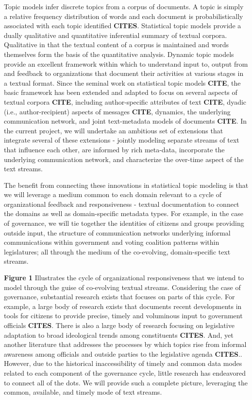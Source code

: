 Topic models infer discrete topics from a corpus of documents. A topic is simply a relative frequency distribution of words and each document is probabilistically associated with each topic identified {\bf CITES}. Statistical topic models provide a dually qualitative and quantitative inferential summary of textual corpora. Qualitative in that the textual content of a corpus is maintained and words themselves form the basis of the quantitative analysis.  Dynamic topic models provide an excellent framework within which to understand input to, output from and feedback to organizations that document their activities at various stages in a textual format. Since the seminal work on statistical topic models {\bf CITE}, the basic framework has been extended and adapted to focus on several aspects of textual corpora {\bf CITE}, including author-specific attributes of text {\bf CITE}, dyadic (i.e., author-recipient) aspects of messages {\bf CITE}, dynamics, the underlying communication network, and joint text-metadata models of documents {\bf CITE}. In the current project, we will undertake an ambitious set of extensions that integrate several of these extensions - jointly modeling separate streams of text that influence each other, are informed by rich meta-data, incorporate the underlying communication network, and characterize the over-time aspect of the text streams.

The benefit from connecting these innovations in statistical topic modeling is that we will leverage a medium common to each domain relevant to a cycle of organizational feedback and responsiveness - textual documentation to connect the domains as well as domain-specific metadata types. For example, in the case of governance, we will tie together the identities of citizens and groups providing outside input, the structure of communication networks underlying informal communications within government and voting coalition patterns within legislatures; all through the medium of the co-evolving, domain-specific text streams.

{\bf Figure 1} Illustrates the cycle of organizational responsiveness that we intend to model through the guise of co-evolving textual streams. Considering the case of governance, substantial research exists that focuses on parts of this cycle. For example, a large body of research exists that documents recent developments in tools for citizens to provide precise, timely and voluminous input to government officials {\bf CITES}. There is also a large body of research focusing on legislative adaptation to broad ideological trends among constituents {\bf CITES}.  And, yet another literature that addresses the processes by which topics rise from informal awareness among officials and outside parties to the legislative agenda {\bf CITES}.. However, due to the historical inaccessibility of timely and common data modes related to each component of the governance cycle, little research has endeavored to connect all of the dots. We will provide such a complete picture, leveraging the common, available, and timely mode of text streams.

